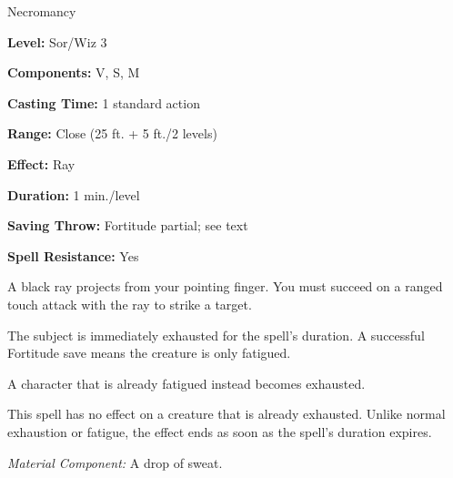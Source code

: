 
Necromancy

\textbf{Level:} Sor/Wiz 3

\textbf{Components:} V, S, M

\textbf{Casting Time:} 1 standard action

\textbf{Range:} Close (25 ft. + 5 ft./2 levels)

\textbf{Effect:} Ray

\textbf{Duration:} 1 min./level

\textbf{Saving Throw:} Fortitude partial; see text

\textbf{Spell Resistance:} Yes

A black ray projects from your pointing finger. You must succeed on a ranged touch 
attack with the ray to strike a target.

The subject is immediately exhausted for the spell's duration. A successful Fortitude 
save means the creature is only fatigued.

A character that is already fatigued instead becomes exhausted.

This spell has no effect on a creature that is already exhausted. Unlike normal 
exhaustion or fatigue, the effect ends as soon as the spell's duration expires.

\textit{Material Component:} A drop of sweat.

